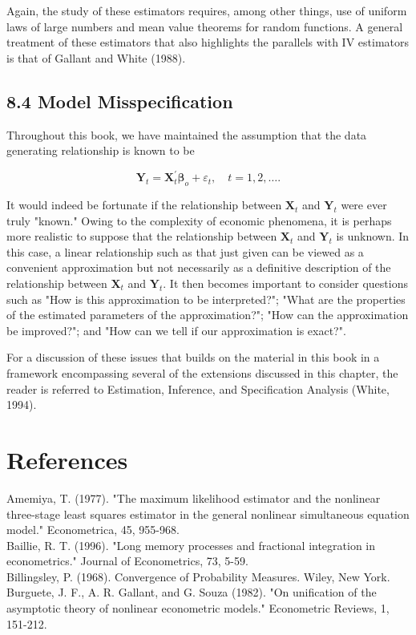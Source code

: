 \documentclass[10pt]{article}
\begin{document}
Again, the study of these estimators requires, among other things, use of uniform laws of large numbers and mean value theorems for random functions. A general treatment of these estimators that also highlights the parallels with IV estimators is that of Gallant and White (1988).

\subsection*{8.4 Model Misspecification}
Throughout this book, we have maintained the assumption that the data generating relationship is known to be

$$
\mathbf{Y}_{t}=\mathbf{X}_{t}^{\prime} \boldsymbol{\beta}_{o}+\varepsilon_{t}, \quad t=1,2, \ldots .
$$

It would indeed be fortunate if the relationship between $\mathbf{X}_{t}$ and $\mathbf{Y}_{t}$ were ever truly "known." Owing to the complexity of economic phenomena, it is perhaps more realistic to suppose that the relationship between $\mathbf{X}_{t}$ and $\mathbf{Y}_{t}$ is unknown. In this case, a linear relationship such as that just given can be viewed as a convenient approximation but not necessarily as a definitive description of the relationship between $\mathbf{X}_{t}$ and $\mathbf{Y}_{t}$. It then becomes important to consider questions such as "How is this approximation to be interpreted?"; "What are the properties of the estimated parameters of the approximation?"; "How can the approximation be improved?"; and "How can we tell if our approximation is exact?".

For a discussion of these issues that builds on the material in this book in a framework encompassing several of the extensions discussed in this chapter, the reader is referred to Estimation, Inference, and Specification Analysis (White, 1994).

\section*{References}
Amemiya, T. (1977). "The maximum likelihood estimator and the nonlinear three-stage least squares estimator in the general nonlinear simultaneous equation model." Econometrica, 45, 955-968.\\
Baillie, R. T. (1996). "Long memory processes and fractional integration in econometrics." Journal of Econometrics, 73, 5-59.\\
Billingsley, P. (1968). Convergence of Probability Measures. Wiley, New York.\\
Burguete, J. F., A. R. Gallant, and G. Souza (1982). "On unification of the asymptotic theory of nonlinear econometric models." Econometric Reviews, 1, 151-212.
\end{document}
